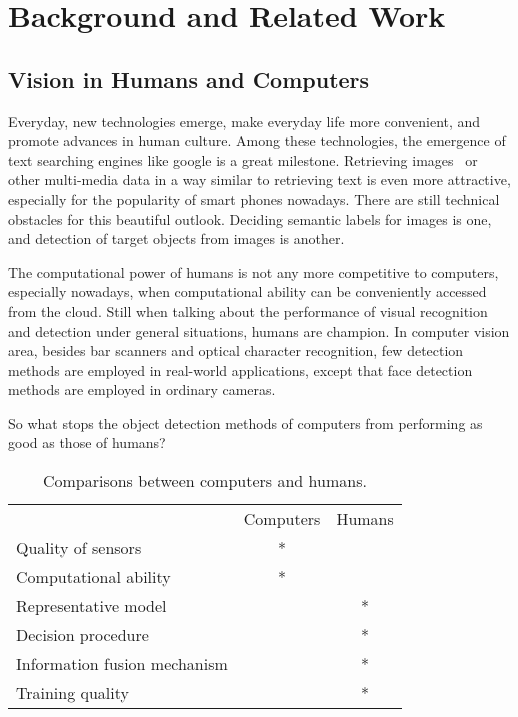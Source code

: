 \chapter{Background and Related Work}
\label{chp2}

\section{Vision in Humans and Computers}

Everyday, new technologies emerge, make everyday life more convenient, and promote advances in human culture. Among these technologies, the emergence of text searching engines like google is a great milestone. Retrieving images~\citep{bisearch} or other multi-media data  in a way similar to retrieving text is even more attractive, especially for the popularity of smart phones nowadays. There are still technical obstacles for this beautiful outlook. Deciding semantic labels for images is one, and detection of target objects from images is another.



The computational power of humans is not any more competitive to computers, especially nowadays, when computational ability can be conveniently accessed from the cloud.
Still when talking about the performance of visual recognition and detection under general situations, humans are champion. In computer vision area, besides bar scanners and optical character recognition, few detection methods are employed in real-world applications, except that face detection methods are employed in ordinary cameras.

So what stops the object detection methods of computers from performing as good as those of humans?

\begin{table}[h]
\centering
\begin{tabular}{lcc}
     \hline
     \hline
                               &	Computers & Humans \\
    Quality of sensors         &	* &   \\
    Computational ability      &	* &	  \\
    Representative model       &	  & * \\
    Decision procedure         &      & *	  \\
    Information fusion mechanism & & *           \\
    Training quality           &      & *	   \\
   \hline
\end{tabular}
\caption[Power comparisons between computers and humans]{Comparisons between computers and humans.}\label{c2tb:tb1}
\end{table}

